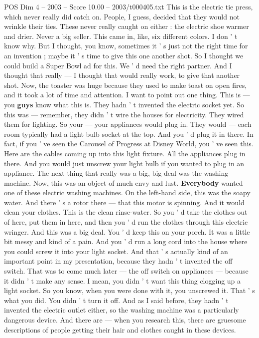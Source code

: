 \begin{textsample}{POS Dim 4 – 2003 – Score 10.00 – 2003/t000405.txt}
This is the electric tie press, which never really did catch on.
People, I guess, decided that they would not wrinkle their ties.
These never really caught on either : the electric shoe warmer and drier.
Never a big seller.
This came in, like, six different colors.
I don ' t know why.
But I thought, you know, sometimes it ' s just not the right time for an invention ; maybe it ' s time to give this one another shot.
So I thought we could build a Super Bowl ad for this.
We ' d need the right partner.
And I thought that really — I thought that would really work, to give that another shot.
Now, the toaster was huge because they used to make toast on open fires, and it took a lot of time and attention.
I want to point out one thing.
This is — you \textbf{guys} know what this is.
They hadn ' t invented the electric socket yet.
So this was — remember, they didn ' t wire the houses for electricity.
They wired them for lighting.
So your — your appliances would plug in.
They would — each room typically had a light bulb socket at the top.
And you ' d plug it in there.
In fact, if you ' ve seen the Carousel of Progress at Disney World, you ' ve seen this.
Here are the cables coming up into this light fixture.
All the appliances plug in there.
And you would just unscrew your light bulb if you wanted to plug in an appliance.
The next thing that really was a big, big deal was the washing machine.
Now, this was an object of much envy and lust. \textbf{Everybody} wanted one of these electric washing machines.
On the left-hand side, this was the soapy water.
And there ' s a rotor there — that this motor is spinning.
And it would clean your clothes.
This is the clean rinse-water.
So you ' d take the clothes out of here, put them in here, and then you ' d run the clothes through this electric wringer.
And this was a big deal.
You ' d keep this on your porch.
It was a little bit messy and kind of a pain.
And you ' d run a long cord into the house where you could screw it into your light socket.
And that ' s actually kind of an important point in my presentation, because they hadn ' t invented the off switch.
That was to come much later — the off switch on appliances — because it didn ' t make any sense.
I mean, you didn ' t want this thing clogging up a light socket.
So you know, when you were done with it, you unscrewed it.
That ' s what you did.
You didn ' t turn it off.
And as I said before, they hadn ' t invented the electric outlet either, so the washing machine was a particularly dangerous device.
And there are — when you research this, there are gruesome descriptions of people getting their hair and clothes caught in these devices.

\end{textsample}
